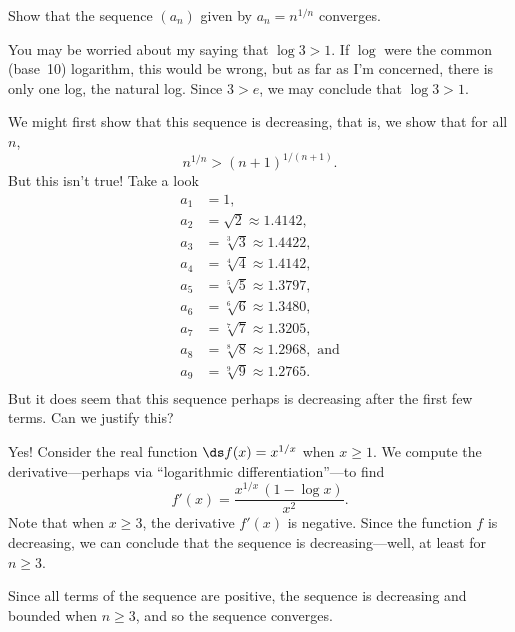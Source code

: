 \documentclass{ximera}
\begin{document}
\begin{example}
\label{example:nth-root-of-n}
Show that the sequence $(a_n)$ given by $a_n = n^{1/n}$ converges.
\end{example}

\begin{warning}
You may be worried about my saying that $\log 3 > 1$.  If
  $\log$ were the common (base~10) logarithm, this would be wrong, but
  as far as I'm concerned, there is only one log, the natural log.
  Since $3 > e$, we may conclude that $\log 3 > 1$.
\end{warning}

\begin{worked-solution}
  We might first show that this sequence is decreasing, that is, we show
  that for all $n$,
  $$
  n^{1/n} > (n+1)^{1/(n+1)}.
  $$
  But this isn't true!  Take a look
  \begin{align*}
    a_1 &= 1, \\
    a_2 &= \sqrt{2} \approx 1.4142, \\
    a_3 &= \sqrt[3]{3} \approx 1.4422, \\
    a_4 &= \sqrt[4]{4} \approx 1.4142, \\
    a_5 &= \sqrt[5]{5} \approx 1.3797, \\
    a_6 &= \sqrt[6]{6} \approx 1.3480, \\
    a_7 &= \sqrt[7]{7} \approx 1.3205, \\
    a_8 &= \sqrt[8]{8} \approx 1.2968, \mbox{ and}\\
    a_9 &= \sqrt[9]{9} \approx 1.2765. \\
  \end{align*}
  But it does seem that this sequence perhaps is decreasing after the
  first few terms.  Can we justify this?

  Yes!  Consider the real function $\ds f(x)=x^{1/x}$ when $x\ge1$.
  We compute the derivative---perhaps via ``logarithmic differentiation''---to find
  $$
  f'(x)=\frac{x^{1/x} \, (1-\log x)}{x^2}.
  $$
  Note that when $x\ge 3$, the derivative $f'(x)$ is negative.  Since the function $f$ is decreasing, we can conclude that the sequence is decreasing---well, at least for $n \geq 3$.

  Since all terms of the sequence are positive, the sequence is
  decreasing and bounded when $n \ge 3$, and so the sequence converges.
\end{worked-solution}

\end{document}
